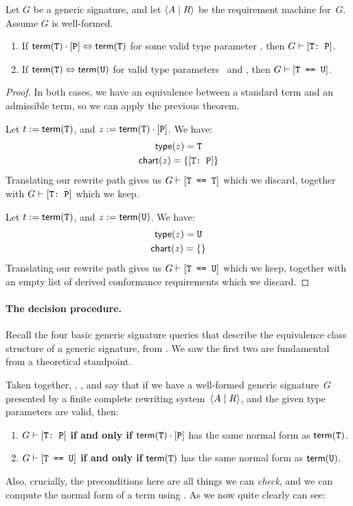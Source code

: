 \documentclass[../generics]{subfiles}
\begin{document}
\begin{corollary}\label{path to derivation swift}
Let $G$ be a generic signature, and let $\langle A \mid R\rangle$ be the requirement machine for~$G$. Assume $G$ is well-formed.
\begin{enumerate}
\item If $\mathsf{term}(\texttt{T})\cdot[\texttt{P}] \Leftrightarrow \mathsf{term}(\texttt{T})$ for some valid type parameter \tT, then $G \vdash [\texttt{T:~P}]$.
\item If $\mathsf{term}(\texttt{T}) \Leftrightarrow \mathsf{term}(\texttt{U})$ for valid type parameters \tT\ and \tU, then $G\vdash[\texttt{T == U}]$.
\end{enumerate}
\end{corollary}
\begin{proof}
In both cases, we have an equivalence between a standard term and an admissible term, so we can apply the previous theorem.

 Let $t := \mathsf{term}(\texttt{T})$, and $z := \mathsf{term}(\texttt{T})\cdot[\texttt{P}]$. We have:
\begin{gather*}
\mathsf{type}(z)=\texttt{T}\\
\mathsf{chart}(z) = \{[\texttt{T:~P}]\}
\end{gather*}
Translating our rewrite path gives us $G\vdash[\texttt{T == T}]$ which we discard, together with $G\vdash[\texttt{T:~P}]$ which we keep.

 Let $t := \mathsf{term}(\texttt{T})$, and $z := \mathsf{term}(\texttt{U})$. We have:
\begin{gather*}
\mathsf{type}(z) = \texttt{U}\\
\mathsf{chart}(z)=\{\}
\end{gather*}
Translating our rewrite path gives us $G\vdash[\texttt{T == U}]$ which we keep, together with an empty list of derived conformance requirements which we discard.
\end{proof}

\paragraph{The decision procedure.} Recall the four basic generic signature queries that describe the equivalence class structure of a generic signature, from . We saw the first two are fundamental from a theoretical standpoint.

Taken together, , , and  say that if we have a well-formed generic signature~$G$ presented by a finite complete rewriting system~$\langle A \mid R\rangle$, and the given type parameters are valid, then:
\begin{enumerate}
\item $G\vdash[\texttt{T:~P}]$ \textbf{if and only if} $\mathsf{term}(\texttt{T})\cdot[\texttt{P}]$ has the same normal form as $\mathsf{term}(\texttt{T})$.
\item $G\vdash[\texttt{T == U}]$ \textbf{if and only if} $\mathsf{term}(\texttt{T})$ has the same normal form as $\mathsf{term}(\texttt{U})$.
\end{enumerate}
Also, crucially, the preconditions here are all things we can \emph{check}, and we can compute the normal form of a term using . As we now quite clearly can see:
\end{document}
